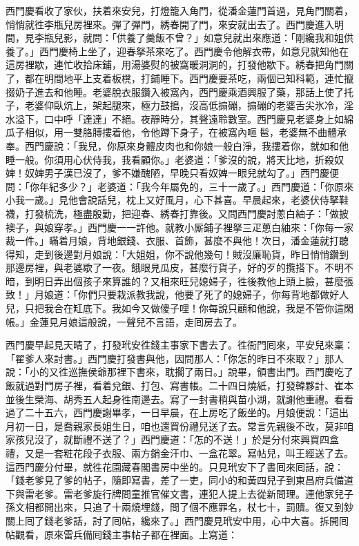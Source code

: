 西門慶看收了家伙，扶着來安兒，打燈籠入角門，從潘金蓮門首過，見角門關着，悄悄就徃李瓶兒房裡來。彈了彈門，{}綉春開了門，來安就出去了。西門慶進入明間，見李瓶兒影，就問：「供養了羹飯不曾？」如意兒就出來應道：「剛纔我和姐供養了。」西門慶椅上坐了，迎春拏茶來吃了。西門慶令他解衣帶，如意兒就知他在這房裡歇，連忙收拾床鋪，用湯婆熨的被窩暖洞洞的，打發他歇下。綉春把角門關了，都在明間地平上支着板櫈，打鋪睡下。西門慶要茶吃，兩個已知科範，連忙攛掇奶子進去和他睡。老婆脫衣服鑽入被窩內，西門慶乘酒興服了藥，那話上使了托子，老婆仰臥炕上，架起腿來，極力鼓搗，沒高低搧磞，搧磞的老婆舌尖氷冷，淫水溢下，口中呼「達達」不絕。夜靜時分，其聲遠聆數室。{}西門慶見老婆身上如綿瓜子相似，用一雙胳膊摟着他，令他蹲下身子，在被窩內咂𩫻䯲，老婆無不曲體承奉。西門慶說：「我兒，你原來身體皮肉也和你娘一般白淨，我摟着你，就如和他睡一般。{}你須用心伏侍我，我看顧你。」老婆道：「爹沒的說，將天比地，折殺奴婢！奴婢男子漢已沒了，爹不嫌醜陋，早晚只看奴婢一眼兒就勾了。」西門慶便問：「你年紀多少？」老婆道：「我今年屬免的，三十一歲了。」西門慶道：「你原來小我一歲。」見他會說話兒，枕上又好風月，心下甚喜。早晨起來，老婆伏侍拏鞋襪，打發梳洗，極盡殷勤，把迎春、綉春打靠後。又問西門慶討蔥白紬子：「做披襖子，與娘穿孝。」西門慶一一許他。就教小厮鋪子裡拏三疋蔥白紬來：「你每一家裁一件。」瞞着月娘，背地銀錢、衣服、首飾，甚麼不與他！次日，潘金蓮就打聽得知，走到後邊對月娘說：「大姐姐，你不說他幾句！賊沒廉恥貨，昨日悄悄鑽到那邊房裡，與老婆歇了一夜。餓眼見瓜皮，甚麼行貨子，好的歹的攬搭下。不明不暗，到明日弄出個孩子來算誰的？又相來旺兒媳婦子，徃後教他上頭上臉，甚麼張致！」月娘道：「你們只要栽派教我說，他要了死了的媳婦子，你每背地都做好人兒，只把我合在缸底下。我如今又做傻子哩！你每說只顧和他說，我是不管你這閑帳。」金蓮見月娘這般說，一聲兒不言語，走囘房去了。

西門慶早起見天晴了，打發玳安徃錢主事家下書去了。徃衙門囘來，平安兒來稟：「翟爹人來討書。」西門慶打發書與他，因問那人：「你怎的昨日不來取？」那人說：「小的又徃巡撫侯爺那裡下書來，{}耽擱了兩日。」說畢，領書出門。西門慶吃了飯就過對門房子裡，看着兌銀、打包、寫書帳。二十四日燒紙，打發韓夥計、崔本並後生榮海、胡秀五人起身徃南邊去。寫了一封書稍與苗小湖，就謝他重禮。看看過了二十五六，西門慶謝畢孝，一日早晨，在上房吃了飯坐的。月娘便說：「這出月初一日，是喬親家長姐生日，咱也還買份禮兒送了去。常言先親後不改，莫非咱家孩兒沒了，就斷禮不送了？」西門慶道：「怎的不送！」於是分付來興買四盒禮，又是一套粧花段子衣服、兩方銷金汗巾、一盒花翠。寫帖兒，叫王經送了去。這西門慶分付畢，就徃花園藏春閣書房中坐的。只見玳安下了書囘來囘話，說：「錢老爹見了爹的帖子，隨即寫書，差了一吏，同小的和黃四兒子到東昌府兵備道下與雷老爹。雷老爹旋行牌問童推官催文書，連犯人提上去從新問理。連他家兒子孫文相都開出來，只追了十兩燒埋錢，問了個不應罪名，杖七十，罰贖。復又到鈔關上囘了錢老爹話，討了囘帖，纔來了。」西門慶見玳安中用，心中大喜。拆開囘帖觀看，原來雷兵備囘錢主事帖子都在裡面。上寫道：

